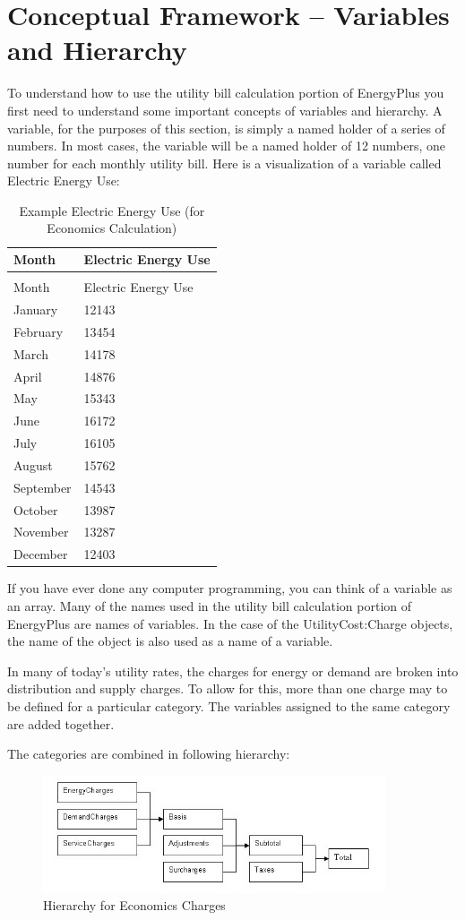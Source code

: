 \section{Conceptual Framework -- Variables and Hierarchy}\label{conceptual-framework-variables-and-hierarchy}

To understand how to use the utility bill calculation portion of EnergyPlus you first need to understand some important concepts of variables and hierarchy. A variable, for the purposes of this section, is simply a named holder of a series of numbers. In most cases, the variable will be a named holder of 12 numbers, one number for each monthly utility bill. Here is a visualization of a variable called Electric Energy Use:

\begin{longtable}[c]{@{}ll@{}}
\caption{Example Electric Energy Use (for Economics Calculation) \label{table:example-electric-energy-use-for-economics}} \tabularnewline
\toprule
Month & Electric Energy Use \tabularnewline
\midrule
\endfirsthead

\caption[]{Example Electric Energy Use (for Economics Calculation)} \tabularnewline
\toprule
Month & Electric Energy Use \tabularnewline
\midrule
\endhead

January & 12143 \tabularnewline
February & 13454 \tabularnewline
March & 14178 \tabularnewline
April & 14876 \tabularnewline
May & 15343 \tabularnewline
June & 16172 \tabularnewline
July & 16105 \tabularnewline
August & 15762 \tabularnewline
September & 14543 \tabularnewline
October & 13987 \tabularnewline
November & 13287 \tabularnewline
December & 12403 \tabularnewline
\bottomrule
\end{longtable}

If you have ever done any computer programming, you can think of a variable as an array. Many of the names used in the utility bill calculation portion of EnergyPlus are names of variables. In the case of the UtilityCost:Charge objects, the name of the object is also used as a name of a variable.

In many of today's utility rates, the charges for energy or demand are broken into distribution and supply charges. To allow for this, more than one charge may to be defined for a particular category. The variables assigned to the same category are added together.

The categories are combined in following hierarchy:

\begin{figure}[hbtp] %
\centering
\includegraphics[width=0.9\textwidth, height=0.9\textheight, keepaspectratio=true]{media/image615.png}
\caption{Hierarchy for Economics Charges \protect \label{fig:hierarchy-for-economics-charges}}
\end{figure}

